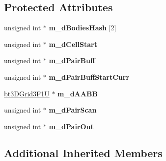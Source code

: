 \subsection*{Protected Attributes}
\begin{DoxyCompactItemize}
\item 
\hypertarget{classbt_cuda_broadphase_a78755b389e9331df2049c85c09dc73e4}{unsigned int $\ast$ {\bfseries m\+\_\+d\+Bodies\+Hash} \mbox{[}2\mbox{]}}\label{classbt_cuda_broadphase_a78755b389e9331df2049c85c09dc73e4}

\item 
\hypertarget{classbt_cuda_broadphase_a0853d8e3417e2422a9a4e4740446351e}{unsigned int $\ast$ {\bfseries m\+\_\+d\+Cell\+Start}}\label{classbt_cuda_broadphase_a0853d8e3417e2422a9a4e4740446351e}

\item 
\hypertarget{classbt_cuda_broadphase_a39450e59f7109a5a98f73cd02e849afa}{unsigned int $\ast$ {\bfseries m\+\_\+d\+Pair\+Buff}}\label{classbt_cuda_broadphase_a39450e59f7109a5a98f73cd02e849afa}

\item 
\hypertarget{classbt_cuda_broadphase_a6f21ffdba51f93a6c4d471bd31a0a5ea}{unsigned int $\ast$ {\bfseries m\+\_\+d\+Pair\+Buff\+Start\+Curr}}\label{classbt_cuda_broadphase_a6f21ffdba51f93a6c4d471bd31a0a5ea}

\item 
\hypertarget{classbt_cuda_broadphase_ac5a6d853d00d8661894b454c157c91ed}{\hyperlink{structbt3_d_grid3_f1_u}{bt3\+D\+Grid3\+F1\+U} $\ast$ {\bfseries m\+\_\+d\+A\+A\+B\+B}}\label{classbt_cuda_broadphase_ac5a6d853d00d8661894b454c157c91ed}

\item 
\hypertarget{classbt_cuda_broadphase_a3dcafe810bfd596e4f5a2c388034968b}{unsigned int $\ast$ {\bfseries m\+\_\+d\+Pair\+Scan}}\label{classbt_cuda_broadphase_a3dcafe810bfd596e4f5a2c388034968b}

\item 
\hypertarget{classbt_cuda_broadphase_aaaa4f69f73ecbaef2b263bbaa41af888}{unsigned int $\ast$ {\bfseries m\+\_\+d\+Pair\+Out}}\label{classbt_cuda_broadphase_aaaa4f69f73ecbaef2b263bbaa41af888}

\end{DoxyCompactItemize}
\subsection*{Additional Inherited Members}



